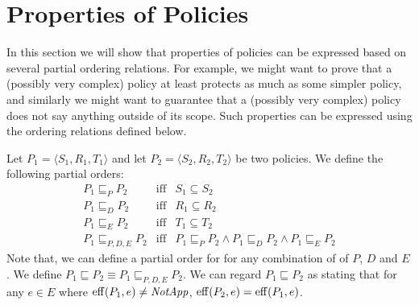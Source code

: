 \section{Properties of Policies}
\label{sec:properties-policies}

In this section we will 
show that properties of policies can be 
expressed based on several partial ordering relations.
For example, we might want to prove
that a (possibly very complex) policy at least protects as much as
some simpler policy, and similarly we might want to guarantee that a
(possibly very complex) policy does not say anything outside of its
scope. Such properties can be expressed using the ordering relations
defined below.

Let $P_1 = \langle S_1, R_1, T_1 \rangle$ and let $P_2 =
\langle S_2, R_2, T_2 \rangle$ be two policies.  
We define the following
partial orders:
\begin{eqnarray*}
  P_1 \sqsubseteq_P P_2 & \mbox{iff} & S_1 \subseteq S_2 \\
  P_1 \sqsubseteq_D P_2 & \mbox{iff} & R_1 \subseteq R_2 \\
  P_1 \sqsubseteq_E P_2 & \mbox{iff} & T_1 \subseteq T_2 \\
  P_1 \sqsubseteq_{P,D,E} P_2 & \mbox{iff} & P_1 \sqsubseteq_P P_2
  \wedge P_1 \sqsubseteq_D P_2 \wedge P_1 \sqsubseteq_E P_2 
\end{eqnarray*}
Note that, we can define a partial order for
for any combination of of $P$, $D$ and $E$.
We define $P_1 \sqsubseteq P_2 \equiv P_1 \sqsubseteq_{P,D,E} P_2$.
We can regard $P_1 \sqsubseteq P_2$ as stating that for any $e \in E$
where $\operatorname{eff} (P_1, e) \neq \text{\textit{NotApp}}$, $\operatorname{eff} (P_2, e) = \operatorname{eff} (P_1,
e)$.

